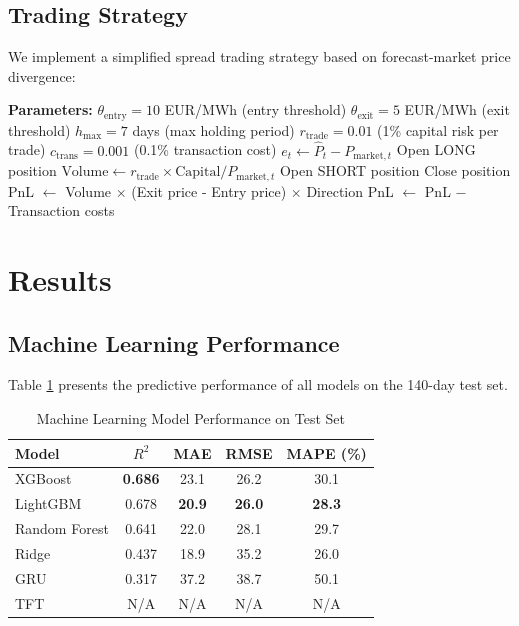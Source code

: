 \documentclass[11pt,a4paper]{article}
\begin{document}
\subsection{Trading Strategy}

We implement a simplified spread trading strategy based on forecast-market price divergence:

\begin{algorithm}[H]
\caption{Electricity Price Trading Strategy}
\begin{algorithmic}[1]
\State \textbf{Parameters:}
\State $\theta_{\text{entry}} = 10$ EUR/MWh (entry threshold)
\State $\theta_{\text{exit}} = 5$ EUR/MWh (exit threshold)
\State $h_{\max} = 7$ days (max holding period)
\State $r_{\text{trade}} = 0.01$ (1\% capital risk per trade)
\State $c_{\text{trans}} = 0.001$ (0.1\% transaction cost)
\State
{}
    \State $e_t \gets \hat{P}_t - P_{\text{market},t}$ 
        \State Open LONG position
        \State $\text{Volume} \gets r_{\text{trade}} \times \text{Capital} / P_{\text{market},t}$
        \State Open SHORT position
    \EndIf
            \State Close position
            \State PnL $\gets$ Volume $\times$ (Exit price - Entry price) $\times$ Direction
            \State PnL $\gets$ PnL $-$ Transaction costs
        \EndIf
    \EndIf
\EndFor
\end{algorithmic}
\end{algorithm}

\section{Results}

\subsection{Machine Learning Performance}

Table \ref{tab:ml_performance} presents the predictive performance of all models on the 140-day test set.

\begin{table}[H]
\centering
\caption{Machine Learning Model Performance on Test Set}
\label{tab:ml_performance}
\begin{tabular}{lcccc}
\toprule
\textbf{Model} & \textbf{$R^2$} & \textbf{MAE} & \textbf{RMSE} & \textbf{MAPE (\%)} \\
\midrule
XGBoost & \textbf{0.686} & 23.1 & 26.2 & 30.1 \\
LightGBM & 0.678 & \textbf{20.9} & \textbf{26.0} & \textbf{28.3} \\
Random Forest & 0.641 & 22.0 & 28.1 & 29.7 \\
Ridge & 0.437 & 18.9 & 35.2 & 26.0 \\
GRU & 0.317 & 37.2 & 38.7 & 50.1 \\
TFT & N/A & N/A & N/A & N/A \\
\bottomrule
\end{tabular}
\end{table}
\end{document}
